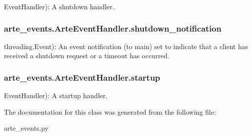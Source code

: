 Event\+Handler)\+: A shutdown handler. 

\subsubsection[{shutdown\+\_\+notification}]{\setlength{\rightskip}{0pt plus 5cm}arte\+\_\+events.\+Arte\+Event\+Handler.\+shutdown\+\_\+notification}\label{classarte__events_1_1_arte_event_handler_a700abfec6c03df636eb76be12d92c2c1}


threading.\+Event)\+: An event notification (to main) set to indicate that a client has received a shutdown request or a timeout has occurred. 

\subsubsection[{startup}]{\setlength{\rightskip}{0pt plus 5cm}arte\+\_\+events.\+Arte\+Event\+Handler.\+startup}\label{classarte__events_1_1_arte_event_handler_a05bee1005609e7a70c28962b7baed13f}


Event\+Handler)\+: A startup handler. 



The documentation for this class was generated from the following file\+:\begin{DoxyCompactItemize}
\item 
arte\+\_\+events.\+py\end{DoxyCompactItemize}
